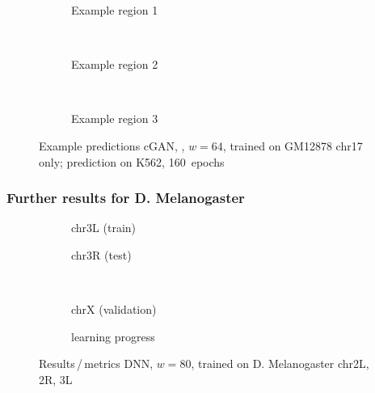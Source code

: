 \begin{figure}[p] %
    \begin{subfigure}{\textwidth}
        \centering
        \caption{Example  region 1} \label{fig:results:GAN64-17single_r1}
    \end{subfigure}\\[3mm]
    \begin{subfigure}{\textwidth}
        \centering
        \caption{Example region 2} \label{fig:results:GAN64-17single_r2}
    \end{subfigure}\\[3mm]
    \begin{subfigure}{\textwidth}
        \centering
        \caption{Example region 3} \label{fig:results:GAN64-17single_r3}
    \end{subfigure}
    \caption{Example predictions cGAN, , $w=64$, trained on GM12878 chr17 only; prediction on K562, 160~epochs} 
     \label{fig:results:GAN64-17single_matrices}
\end{figure}
\clearpage

\subsubsection{Further results for D. Melanogaster} \label{sec:appendix:cgan_drosophila}
\begin{figure}[h!] %
    \begin{subfigure}{0.45\textwidth}
        \scriptsize
        \caption{chr3L (train)}
    \end{subfigure} \hfill
    \begin{subfigure}{0.45\textwidth}
        \scriptsize
        \caption{chr3R (test)}
    \end{subfigure}\\[5mm]
    \begin{subfigure}{0.45\textwidth}
        \scriptsize
        \caption{chrX (validation)}
    \end{subfigure}\hfill
    \begin{subfigure}{0.45\textwidth}
        \scriptsize
        \caption{learning progress} \label{fig:appendix:DNN_drosophila_progress}
    \end{subfigure}
    \caption{Results\,/\,metrics DNN, $w=80$, trained on D. Melanogaster chr2L, 2R, 3L}   \label{fig:appendix:DNN_drosophila_pearson}
\end{figure}

